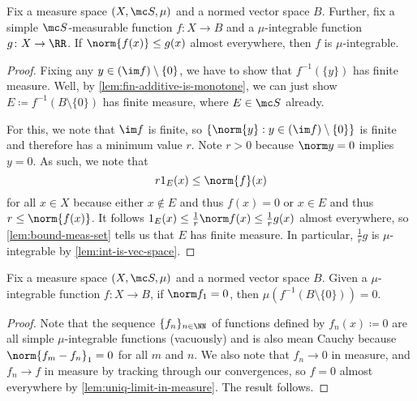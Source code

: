 \documentclass[../notes.tex]{subfiles}
\begin{document}
\begin{corollary}
	Fix a measure space $(X,\mc S,\mu)$ and a normed vector space $B$. Further, fix a simple $\mc S$-measurable function $f\colon X\to B$ and a $\mu$-integrable function $g\colon X\to\RR$. If $\norm{f(x)}\le g(x)$ almost everywhere, then $f$ is $\mu$-integrable.
\end{corollary}
\begin{proof}
	Fixing any $y\in(\im f)\setminus\{0\}$, we have to show that $f^{-1}(\{y\})$ has finite measure. Well, by \autoref{lem:fin-additive-is-monotone}, we can just show $E\coloneqq f^{-1}(B\setminus\{0\})$ has finite measure, where $E\in\mc S$ already.

	For this, we note that $\im f$ is finite, so $\{\norm{y}:y\in(\im f)\setminus\{0\}\}$ is finite and therefore has a minimum value $r$. Note $r>0$ because $\norm y=0$ implies $y=0$. As such, we note that
	\[r1_E(x)\le\norm{f}(x)\]
	for all $x\in X$ because either $x\notin E$ and thus $f(x)=0$ or $x\in E$ and thus $r\le\norm{f(x)}$. It follows $1_E(x)\le\frac1r\norm f(x)\le\frac1rg(x)$ almost everywhere, so \autoref{lem:bound-meas-set} tells us that $E$ has finite measure. In particular, $\frac 1rg$ is $\mu$-integrable by \autoref{lem:int-is-vec-space}. 
\end{proof}
\begin{lemma}
	Fix a measure space $(X,\mc S,\mu)$ and a normed vector space $B$. Given a $\mu$-integrable function $f\colon X\to B$, if $\norm f_1=0$, then $\mu\left(f^{-1}(B\setminus\{0\})\right)=0$.
\end{lemma}
\begin{proof}
	Note that the sequence $\{f_n\}_{n\in\NN}$ of functions defined by $f_n(x)\coloneqq0$ are all simple $\mu$-integrable functions (vacuously) and is also mean Cauchy because $\norm{f_m-f_n}_1=0$ for all $m$ and $n$. We also note that $f_n\to0$ in measure, and $f_n\to f$ in measure by tracking through our convergences, so $f=0$ almost everywhere by \autoref{lem:uniq-limit-in-measure}. The result follows.
\end{proof}
\end{document}
